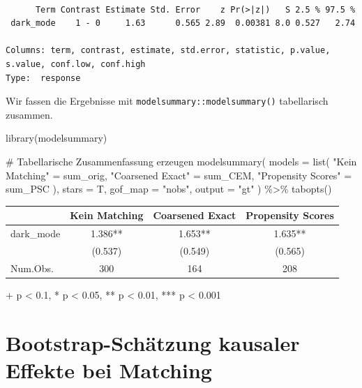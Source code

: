 \documentclass[
  a4paper,
  DIV=11,
  oneside]{scrreprt}
\newenvironment{Shaded}{\begin{snugshade}}{\end{snugshade}}
\newcommand{\AttributeTok}[1]{\textcolor[rgb]{0.40,0.45,0.13}{#1}}
\newcommand{\CommentTok}[1]{\textcolor[rgb]{0.37,0.37,0.37}{#1}}
\newcommand{\FunctionTok}[1]{\textcolor[rgb]{0.28,0.35,0.67}{#1}}
\newcommand{\NormalTok}[1]{\textcolor[rgb]{0.00,0.23,0.31}{#1}}
\newcommand{\OtherTok}[1]{\textcolor[rgb]{0.00,0.23,0.31}{#1}}
\newcommand{\SpecialCharTok}[1]{\textcolor[rgb]{0.37,0.37,0.37}{#1}}
\newcommand{\StringTok}[1]{\textcolor[rgb]{0.13,0.47,0.30}{#1}}
\begin{document}
\begin{verbatim}

      Term Contrast Estimate Std. Error    z Pr(>|z|)   S 2.5 % 97.5 %
 dark_mode    1 - 0     1.63      0.565 2.89  0.00381 8.0 0.527   2.74

Columns: term, contrast, estimate, std.error, statistic, p.value, s.value, conf.low, conf.high 
Type:  response 
\end{verbatim}

Wir fassen die Ergebnisse mit \texttt{modelsummary::modelsummary()}
tabellarisch zusammen.

\begin{Shaded}
\begin{Highlighting}[]
\FunctionTok{library}\NormalTok{(modelsummary)}

\CommentTok{\# Tabellarische Zusammenfassung erzeugen}
\FunctionTok{modelsummary}\NormalTok{(}
  \AttributeTok{models =} \FunctionTok{list}\NormalTok{(}
   \StringTok{"Kein Matching"} \OtherTok{=}\NormalTok{ sum\_orig, }
   \StringTok{"Coarsened Exact"} \OtherTok{=}\NormalTok{ sum\_CEM, }
   \StringTok{"Propensity Scores"} \OtherTok{=}\NormalTok{ sum\_PSC}
\NormalTok{  ),}
  \AttributeTok{stars =}\NormalTok{ T, }
  \AttributeTok{gof\_map =} \StringTok{"nobs"}\NormalTok{, }
  \AttributeTok{output =} \StringTok{"gt"}
\NormalTok{) }\SpecialCharTok{\%\textgreater{}\%}
  \FunctionTok{tabopts}\NormalTok{()}
\end{Highlighting}
\end{Shaded}

\setlength{\LTpost}{0mm}
\begin{longtable*}{lccc}
\toprule
  & Kein Matching & Coarsened Exact & Propensity Scores \\ 
\midrule\addlinespace[2.5pt]
dark\_mode & 1.386** & 1.653** & 1.635** \\ 
 & (0.537) & (0.549) & (0.565) \\ 
Num.Obs. & 300 & 164 & 208 \\ 
\bottomrule
\end{longtable*}
\begin{minipage}{\linewidth}
+ p < 0.1, * p < 0.05, ** p < 0.01, *** p < 0.001\\
\end{minipage}

\hypertarget{sec-bootmatching}{%
\section{Bootstrap-Schätzung kausaler Effekte bei
Matching}\label{sec-bootmatching}}
\end{document}
